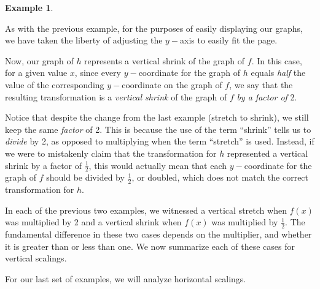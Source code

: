 \documentclass[12pt]{book}
\theoremstyle{definition}
\newtheorem{example}{Example}
\begin{document}
\begin{example}
\begin{multicols}{2}
\begin{center}
\end{center} 
\end{multicols}
As with the previous example, for the purposes of easily displaying our graphs, we have taken the liberty of adjusting the $y-$axis to easily fit the page.\par
Now, our graph of $h$ represents a vertical shrink of the graph of $f$.  In this case, for a given value $x$, since every $y-$coordinate for the graph of $h$ equals {\it half} the value of the corresponding $y-$coordinate on the graph of $f$, we say that the resulting transformation is a {\it vertical shrink} of the graph of $f$ {\it by a factor of} 2.\par
Notice that despite the change from the last example (stretch to shrink), we still keep the same {\it factor} of 2.  This is because the use of the term ``shrink'' tells us to {\it divide} by 2, as opposed to multiplying when the term ``stretch'' is used.  Instead, if we were to mistakenly claim that the transformation for $h$ represented a vertical shrink by a factor of $\frac{1}{2}$, this would actually mean that each $y-$coordinate for the graph of $f$ should be divided by $\frac{1}{2}$, or doubled, which does not match the correct transformation for $h$.
\end{example}
In each of the previous two examples, we witnessed a vertical stretch when $f(x)$ was multiplied by 2 and a vertical shrink when $f(x)$ was multiplied by $\frac{1}{2}$.  The fundamental difference in these two cases depends on the multiplier, and whether it is greater than or less than one.  We now summarize each of these cases for vertical scalings.
\begin{center}
\end{center}
For our last set of examples, we will analyze horizontal scalings.
\end{document}
